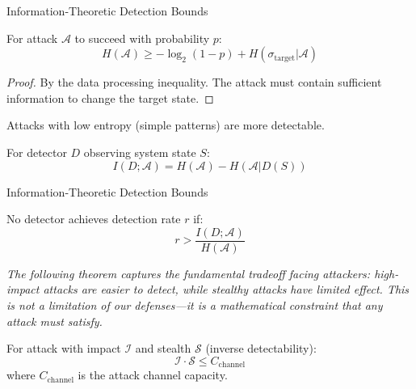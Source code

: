 \documentclass[
  ignorenonframetext,
]{beamer}
\begin{document}
\begin{frame}[allowframebreaks]{Information-Theoretic Detection Bounds}
\begin{theorem}
\label{thm:min-entropy}
For attack $\mathcal{A}$ to succeed with probability $p$:
\begin{equation}
\label{eq:min-entropy}
H(\mathcal{A}) \geq -\log_2(1-p) + H(\sigma_{\text{target}}|\mathcal{A})
\end{equation}
\end{theorem}

\begin{proof}
By the data processing inequality. The attack must contain sufficient information to change the target state.
\end{proof}

\begin{corollary}
\label{cor:low-entropy-detectable}
Attacks with low entropy (simple patterns) are more detectable.
\end{corollary}

\begin{definition}
\label{def:detector-gain}
For detector $D$ observing system state $S$:
\begin{equation}
\label{eq:detector-gain}
I(D; \mathcal{A}) = H(\mathcal{A}) - H(\mathcal{A}|D(S))
\end{equation}
\end{definition}

\end{frame}

\begin{frame}[allowframebreaks]{Information-Theoretic Detection Bounds}
\begin{theorem}
\label{thm:detection-limit}
No detector achieves detection rate $r$ if:
\begin{equation}
\label{eq:detection-limit}
r > \frac{I(D; \mathcal{A})}{H(\mathcal{A})}
\end{equation}
\end{theorem}

\emph{The following theorem captures the fundamental tradeoff facing
attackers: high-impact attacks are easier to detect, while stealthy
attacks have limited effect. This is not a limitation of our
defenses---it is a mathematical constraint that any attack must
satisfy.}

\begin{theorem}
\label{thm:stealth-impact}
For attack with impact $\mathcal{I}$ and stealth $\mathcal{S}$ (inverse detectability):
\begin{equation}
\label{eq:stealth-impact}
\mathcal{I} \cdot \mathcal{S} \leq C_{\text{channel}}
\end{equation}
where $C_{\text{channel}}$ is the attack channel capacity.
\end{theorem}

\end{frame}
\end{document}
